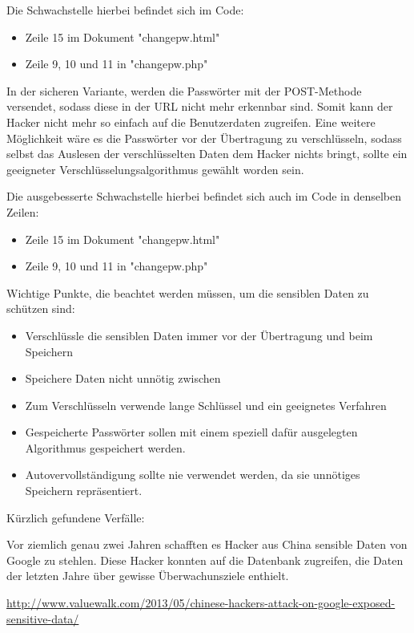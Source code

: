 \documentclass[12pt,a4paper,titlepage,oneside]{scrartcl}
\begin{document}
Die Schwachstelle hierbei befindet sich im Code:
\begin{itemize}
\item Zeile 15 im Dokument "changepw.html"
\item Zeile 9, 10 und 11 in "changepw.php"
\end{itemize} 

In der sicheren Variante, werden die Passwörter mit der POST-Methode versendet, sodass diese in der URL nicht mehr erkennbar sind. Somit kann der Hacker nicht mehr so einfach auf die Benutzerdaten zugreifen. Eine weitere Möglichkeit wäre es die Passwörter vor der Übertragung zu verschlüsseln, sodass selbst das Auslesen der verschlüsselten Daten dem Hacker nichts bringt, sollte ein geeigneter Verschlüsselungsalgorithmus gewählt worden sein.

Die ausgebesserte Schwachstelle hierbei befindet sich auch im Code in denselben Zeilen:
\begin{itemize}
\item Zeile 15 im Dokument "changepw.html"
\item Zeile 9, 10 und 11 in "changepw.php"
\end{itemize} 

Wichtige Punkte, die beachtet werden müssen, um die sensiblen Daten zu schützen sind:

\begin{itemize}
\item Verschlüssle die sensiblen Daten immer vor der Übertragung und beim Speichern
\item Speichere Daten nicht unnötig zwischen
\item Zum Verschlüsseln verwende lange Schlüssel und ein geeignetes Verfahren
\item Gespeicherte Passwörter sollen mit einem speziell dafür ausgelegten Algorithmus gespeichert werden.
\item Autovervollständigung sollte nie verwendet werden, da sie unnötiges Speichern repräsentiert.
\end{itemize}

Kürzlich gefundene Verfälle:

Vor ziemlich genau zwei Jahren schafften es Hacker aus China sensible Daten von Google zu stehlen. Diese Hacker konnten auf die Datenbank zugreifen, die Daten der letzten Jahre über gewisse Überwachunsziele enthielt. 

\url{http://www.valuewalk.com/2013/05/chinese-hackers-attack-on-google-exposed-sensitive-data/}
\end{document}
